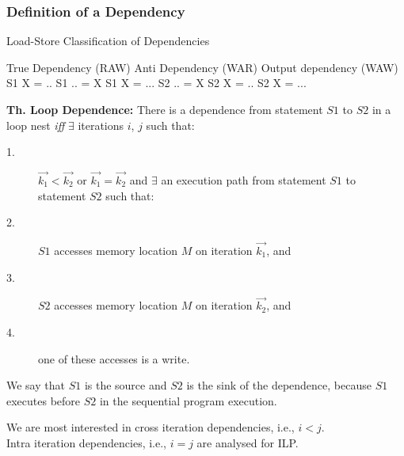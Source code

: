 \documentclass{beamer}
\newcommand{\emp}[1]{\textcolor{DikuRed}{ #1}}
\begin{document}
\begin{frame}[fragile,t]
  \frametitle{Definition of a Dependency} %

\begin{block}{Load-Store Classification of Dependencies}
\begin{colorcode}
True Dependency (RAW)    Anti Dependency (WAR)    Output dependency (WAW)
S1    X  = ..            S1    .. = X             S1    X = ...            
S2    .. = X             S2    X  = ..            S2    X = ...
\end{colorcode}
\end{block} 

\smallskip

{\bf Th. Loop Dependence:} There is a dependence from statement $S1$ to $S2$
in a loop nest {\em iff} $\exists$ iterations $i$, $j$ such that:
\begin{description}
    \item[1.] $\vec{k_1} < \vec{k_2}$ or $\vec{k_1} = \vec{k_2}$ and $\exists$ 
                an execution path from statement $S1$ to statement $S2$ \emp{such that:}
    \item[2.] $S1$ accesses memory location $M$ on iteration $\vec{k_1}$, and
    \item[3.] $S2$ accesses memory location $M$ on iteration $\vec{k_2}$, and
    \item[4.] one of these accesses is a write.
\end{description}
\medskip

\emp{We say that $S1$ is the source and $S2$ is the sink of the dependence}, 
because $S1$ executes before $S2$ in the sequential program execution.

\medskip
We are most interested in cross iteration dependencies, i.e., $i < j$.\\\smallskip
Intra iteration dependencies, i.e., $i = j$ are analysed for ILP. 

\end{frame}
\end{document}
